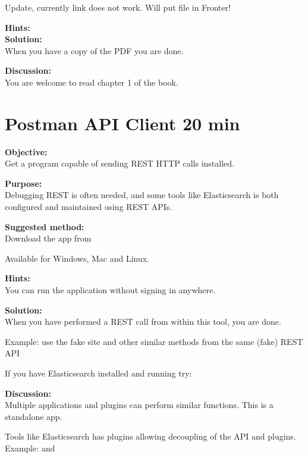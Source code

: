 \documentclass[a4paper,11pt,notitlepage]{report}
\begin{document}
Update, currently link does not work. Will put file in Fronter!

{\bf Hints:}\\

{\bf Solution:}\\
When you have a copy of the PDF you are done.

{\bf Discussion:}\\
You are welcome to read chapter 1 of the book.




\chapter{Postman API Client 20 min}
\label{ex:postman-api}


{\bf Objective:}\\
Get a program capable of sending REST HTTP calls installed.


{\bf Purpose:}\\
Debugging REST is often needed, and some tools like Elasticsearch is both configured and maintained using REST APIs.

{\bf Suggested method:}\\
Download the app from

Available for Windows, Mac and Linux.

{\bf Hints:}\\
You can run the application without signing in anywhere.

{\bf Solution:}\\
When you have performed a REST call from within this tool, you are done.

Example: use the fake site  and other similar methods from the same (fake) REST API

If you have Elasticsearch installed and running try: 

{\bf Discussion:}\\
Multiple applications and plugins can perform similar functions. This is a standalone app.

Tools like Elasticsearch has plugins allowing decoupling of the API and plugins. Example:  and 
\end{document}
